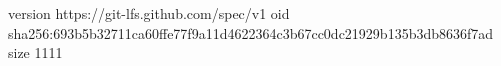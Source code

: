 version https://git-lfs.github.com/spec/v1
oid sha256:693b5b32711ca60ffe77f9a11d4622364c3b67cc0dc21929b135b3db8636f7ad
size 1111
